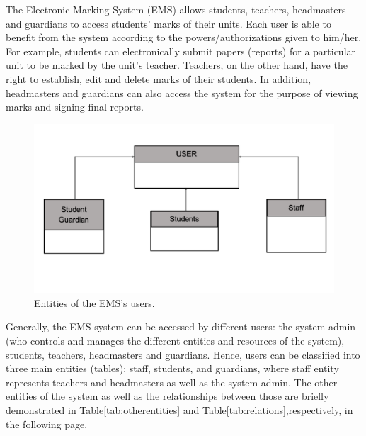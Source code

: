 The Electronic Marking System (EMS) allows students, teachers, headmasters and guardians to access students’ marks of their units.  Each user is able to benefit from the system according to the powers/authorizations given to him/her.  For example, students can electronically submit papers (reports) for a particular unit to be marked by the unit's teacher.  Teachers, on the other hand, have the right to establish, edit and delete marks of their students.  In addition, headmasters and guardians can also access the system for the purpose of viewing marks and signing final reports.  

\begin{figure}[bht]
\centering
\includegraphics[scale=0.26]{EMSEntities.png}
\caption{Entities of the EMS's users.}
\label{fig:RBACPol}
\end{figure}

Generally, the EMS system can be accessed by different users: the system admin (who controls and manages the different entities and resources of the system), students, teachers, headmasters and guardians.  Hence, users can be classified into three main entities (tables): staff, students, and guardians, where staff entity represents teachers and headmasters as well as the system admin.
The other entities of the system as well as the relationships between those are briefly demonstrated in Table\ref{tab:otherentities} and Table\ref{tab:relations},respectively, in the following page.

